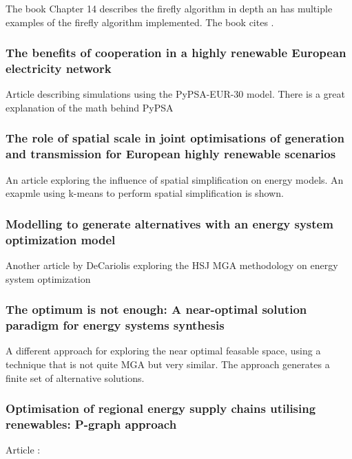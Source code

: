 The book \cite{Bio_computation_book} Chapter 14 describes the firefly algorithm in depth an has multiple examples of the firefly algorithm implemented. The book cites \cite{FireFly_MGA_Article} . 

\subsubsection*{The benefits of cooperation in a highly renewable European electricity network \cite{PypsaModel}}
Article describing simulations using the PyPSA-EUR-30 model. There is a great explanation of the math behind PyPSA 

\subsubsection*{The role of spatial scale in joint optimisations of generation and transmission for European highly renewable scenarios\cite{spatialInfluence} }
An article exploring the influence of spatial simplification on energy models. An exapmle using k-means to perform spatial simplification is shown.  

\subsubsection*{Modelling to generate alternatives with an energy system optimization model \cite{DECAROLIS2016}}
Another article by DeCariolis exploring the HSJ MGA methodology on energy system optimization 

\subsubsection*{The optimum is not enough: A near-optimal solution paradigm for energy systems synthesis \cite{Optimum_not_enough}}
A different approach for exploring the near optimal feasable space, using a technique that is not quite MGA but very similar. The approach generates a finite set of alternative solutions. 

\subsubsection*{Optimisation of regional energy supply chains utilising renewables: P-graph approach}
Article : \cite{P_graph}


